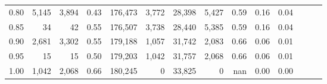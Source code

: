 \begin{tabular}{rrrrrrrrrrrrrr}
0.80 &   5,145 &  3,894 &  0.43 &  176,473 &    3,772 &  28,398 &   5,427 &  0.59 &  0.16 &      0.04 \\
0.85 &      34 &     42 &  0.55 &  176,507 &    3,738 &  28,440 &   5,385 &  0.59 &  0.16 &      0.04 \\
0.90 &   2,681 &  3,302 &  0.55 &  179,188 &    1,057 &  31,742 &   2,083 &  0.66 &  0.06 &      0.01 \\
0.95 &      15 &     15 &  0.50 &  179,203 &    1,042 &  31,757 &   2,068 &  0.66 &  0.06 &      0.01 \\
1.00 &   1,042 &  2,068 &  0.66 &  180,245 &        0 &  33,825 &       0 &   nan &  0.00 &      0.00 \\
\bottomrule
\end{tabular}
